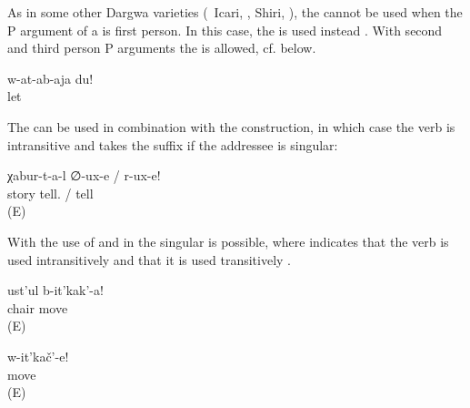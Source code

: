 As in some other Dargwa varieties (\teg\ Icari, \citealp[98]{Sumbatova.Mutalov2003}, Shiri, \citealp{BelyaevInPreparation}), the  cannot be used when the P argument of a  is first person. In this case, the  is used instead . With second and third person P arguments the  is allowed, cf.  below.

\begin{exe}
	\ex	\label{ex:Leave me}
	\gll	w-at-ab-aja	du!\\
		let	\\
	\glt	{}
\end{exe}

\hspace*{-0.12148pt}The  can be used in combination with the  construction, in which case the verb is intransitive and takes the suffix  if the addressee is singular: 

\begin{exe}
	\ex	\label{ex:Tell stories}
	\gll	χabur-t-a-l	∅-ux-e	/	r-ux-e!\\
		story	tell.	/	tell\\
	\glt	{} (E)
\end{exe}

With  the use of  and  in the  singular is possible, where  indicates that the verb is used intransitively and  that it is used transitively .

\begin{exe}

		\ex	\label{ex:Move the chair}
		\gll	ust'ul	b-it'kak'-a!\\
			chair	move\\
		\glt	{} (E)
	
		\ex	\label{ex:Move (yourself)}
		\gll	w-it'kač'-e!\\
			move\\
		\glt	{} (E)

\end{exe}

